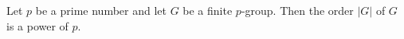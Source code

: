 Let $p$ be a prime number and let $G$ be a finite $p$-group. Then the order $|G|$ of $G$ is a power of $p$.
